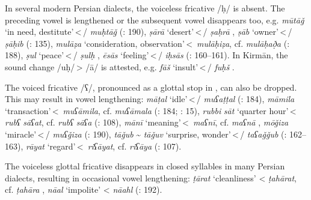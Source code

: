 \documentclass[output=paper]{langsci/langscibook}
\begin{document}

In several modern Persian dialects, the voiceless  fricative /ḥ/ is absent. The preceding vowel is lengthened or the subsequent vowel disappears too, e.g. \textit{mūtāǧ} ‘in need, destitute’\,<\,/ \textit{muḥtāǧ} (\citealt{Īzadpanāh2001}: 190), \textit{ṣārā} ‘desert’\,<\,/ \textit{ṣaḥrā} \citep[15]{Sarlak2002}, \textit{ṣāb} ‘owner’\,<\,/ \textit{ṣāḥib} (\citealt{Ṣarrāfī1996}: 135), \textit{mulāẓa} ‘consideration, observation’\,<\, \textit{mulāḥiẓa}, cf.  \textit{mulāḥað̣a} (\citealt{Ṣarrāfī1996}: 188), \textit{ṣul} ‘peace’\,<\,/ \textit{ṣulḥ} \citep{Stilo2001}, \textit{ēsās} ‘feeling’\,<\,/ \textit{iḥsās} (\citealt{Salāmī2004}: 160–161). In Kirmān, the sound change /uḥ/\,> /ā/ is attested, e.g. \textit{fāš} ‘insult’\,<\,/ \textit{fuḥš} \citep{Borjian2017}.

The voiced  fricative /ʕ/, pronounced as a glottal stop in , can also be dropped. This may result in vowel lengthening: \textit{māṭal} ‘idle’\,<\,/ \textit{muʕaṭṭal} (\citealt{Ṣarrāfī1996}: 184), \textit{māmila} ‘transaction’\,<\, \textit{muʕāmila}, cf.  \textit{muʕāmala} (\citealt{Ṣarrāfī1996}: 184; \citealt{Sarlak2002}: 15), \textit{rubbi} \textit{sāt} ‘quarter hour’\,<\, \textit{rubʕ} \textit{sāʕat}, cf.  \textit{rubʕ} \textit{sāʕa} (\citealt{Ṣarrāfī1996}: 108), \textit{mānī} ‘meaning’\,<\, \textit{maʕnī}, cf.  \textit{maʕnā} \citep[15]{Sarlak2002}, \textit{mōǧiza} ‘miracle’\,<\,/ \textit{muʕǧiza} (\citealt{Īzadpanāh2001}: 190), \textit{tāǧub} \~{} \textit{tāǧuv} ‘surprise, wonder’\,<\,/ \textit{taʕaǧǧub} (\citealt{Salāmī2004}: 162–163), \textit{rāyat} ‘regard’\,<\, \textit{riʕāyat}, cf.  \textit{riʕāya} (\citealt{Ṣarrāfī1996}: 107).


The voiceless glottal fricative disappears in closed syllables in many Persian dialects, resulting in occasional vowel lengthening: \textit{ṭārat} ‘cleanliness’ <  \textit{ṭahārat}, cf.  \textit{ṭahāra} \citep[76]{Sarlak2002}, \textit{nāal} ‘impolite’ <  \textit{nāahl} (\citealt{Īzadpanāh2001}: 192).

\end{document}
